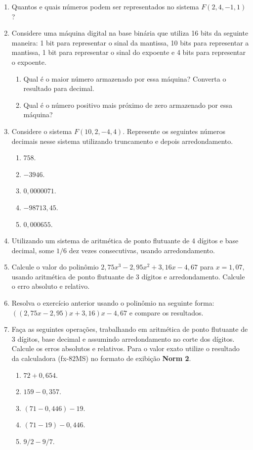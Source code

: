 \documentclass[12pt,a4paper]{book}
\begin{document}
\begin{enumerate}
    \item Quantos e quais números podem ser representados no sistema $F(2, 4, -1, 1)$?

    \item Considere uma máquina digital na base binária que utiliza 16 bits da seguinte maneira: 1 bit para representar o sinal da mantissa, 10 bits para representar a mantissa, 1 bit para representar o sinal do expoente e 4 bits para representar o expoente.
        \begin{enumerate}
            \item Qual é o maior número armazenado por essa máquina? Converta o resultado para decimal.
            \item Qual é o número positivo mais próximo de zero armazenado por essa máquina?
        \end{enumerate}

    \item Considere o sistema $F(10, 2, -4, 4)$. Represente os seguintes números decimais nesse sistema utilizando truncamento e depois arredondamento.
        \begin{enumerate}
            \item $758$.
            \item $-3946$.
            \item $0,0000071$.
            \item $-98713,45$.
            \item $0,000655$.
        \end{enumerate}

    \item Utilizando um sistema de aritmética de ponto flutuante de 4 dígitos e base decimal, some $1/6$ dez vezes consecutivas, usando arredondamento.

    \item Calcule o valor do polinômio $2,75x^3-2,95x^2+3,16x-4,67$ para $x=1,07$, usando aritmética de ponto flutuante de 3 dígitos e arredondamento. Calcule o erro absoluto e relativo.

    \item Resolva o exercício anterior usando o polinômio na seguinte forma: $((2,75x-2,95)x+3,16)x-4,67$ e compare os resultados.

    \item Faça as seguintes operações, trabalhando em aritmética de ponto flutuante de 3 dígitos, base decimal e assumindo arredondamento no corte dos dígitos. Calcule os erros absolutos e relativos. Para o valor exato utilize o resultado da calculadora (fx-82MS) no formato de exibição \textbf{Norm 2}.
        \begin{enumerate}
            \item $72 + 0,654$.
            \item $159-0,357$.
            \item $(71-0,446)-19$.
            \item $(71-19)-0,446$.
            \item $9/2-9/7$.
        \end{enumerate}


\end{enumerate}
\end{document}

